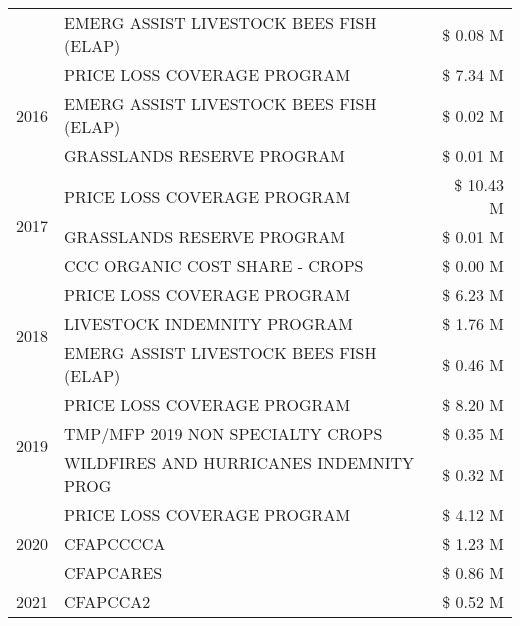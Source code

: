 \begin{tabular}{llr}
 & EMERG ASSIST LIVESTOCK BEES FISH (ELAP) & \$ 0.08 M \\
\cline{1-3}
\multirow[t]{3}{*}{2016} & PRICE LOSS COVERAGE PROGRAM & \$ 7.34 M \\
 & EMERG ASSIST LIVESTOCK BEES FISH (ELAP) & \$ 0.02 M \\
 & GRASSLANDS RESERVE PROGRAM & \$ 0.01 M \\
\cline{1-3}
\multirow[t]{3}{*}{2017} & PRICE LOSS COVERAGE PROGRAM & \$ 10.43 M \\
 & GRASSLANDS RESERVE PROGRAM & \$ 0.01 M \\
 & CCC ORGANIC COST SHARE - CROPS & \$ 0.00 M \\
\cline{1-3}
\multirow[t]{3}{*}{2018} & PRICE LOSS COVERAGE PROGRAM & \$ 6.23 M \\
 & LIVESTOCK INDEMNITY PROGRAM & \$ 1.76 M \\
 & EMERG ASSIST LIVESTOCK BEES FISH (ELAP) & \$ 0.46 M \\
\cline{1-3}
\multirow[t]{3}{*}{2019} & PRICE LOSS COVERAGE PROGRAM & \$ 8.20 M \\
 & TMP/MFP 2019 NON SPECIALTY CROPS & \$ 0.35 M \\
 & WILDFIRES AND HURRICANES INDEMNITY PROG & \$ 0.32 M \\
\cline{1-3}
\multirow[t]{3}{*}{2020} & PRICE LOSS COVERAGE PROGRAM & \$ 4.12 M \\
 & CFAPCCCCA & \$ 1.23 M \\
 & CFAPCARES & \$ 0.86 M \\
\cline{1-3}
2021 & CFAPCCA2 & \$ 0.52 M \\
\cline{1-3}
\bottomrule
\end{tabular}
